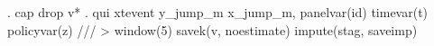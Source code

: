 . cap drop v*
{\smallskip}
. qui xtevent y_jump_m x_jump_m, panelvar(id) timevar(t) policyvar(z) ///
> window(5) savek(v, noestimate) impute(stag, saveimp) 
{\smallskip}
